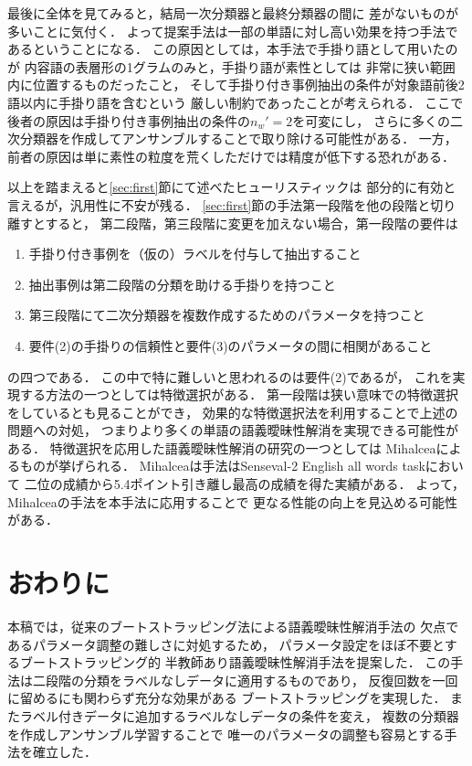 \documentclass[japanese]{jnlp_1.4}
\begin{document}
最後に全体を見てみると，結局一次分類器と最終分類器の間に
差がないものが多いことに気付く．
よって提案手法は一部の単語に対し高い効果を持つ手法であるということになる．
この原因としては，本手法で手掛り語として用いたのが
内容語の表層形の1グラムのみと，手掛り語が素性としては
非常に狭い範囲内に位置するものだったこと，
そして手掛り付き事例抽出の条件が対象語前後2語以内に手掛り語を含むという
厳しい制約であったことが考えられる．
ここで後者の原因は手掛り付き事例抽出の条件の$n_w'=2$を可変にし，
さらに多くの二次分類器を作成してアンサンブルすることで取り除ける可能性がある．
一方，前者の原因は単に素性の粒度を荒くしただけでは精度が低下する恐れがある．

以上を踏まえると\ref{sec:first}節にて述べたヒューリスティックは
部分的に有効と言えるが，汎用性に不安が残る．
\ref{sec:first}節の手法第一段階を他の段階と切り離すとすると，
第二段階，第三段階に変更を加えない場合，第一段階の要件は
\begin{enumerate}
\item 手掛り付き事例を（仮の）ラベルを付与して抽出すること
\item 抽出事例は第二段階の分類を助ける手掛りを持つこと
\item 第三段階にて二次分類器を複数作成するためのパラメータを持つこと
\item 要件(2)の手掛りの信頼性と要件(3)のパラメータの間に相関があること
\end{enumerate}
の四つである．
この中で特に難しいと思われるのは要件(2)であるが，
これを実現する方法の一つとしては特徴選択がある．
第一段階は狭い意味での特徴選択をしているとも見ることができ，
効果的な特徴選択法を利用することで上述の問題への対処，
つまりより多くの単語の語義曖昧性解消を実現できる可能性がある．
特徴選択を応用した語義曖昧性解消の研究の一つとしては
Mihalceaによるものが挙げられる\cite{Mihalcea02}．
Mihalceaは手法はSenseval-2 English all words taskにおいて
二位の成績から5.4ポイント引き離し最高の成績を得た実績がある．
よって，Mihalceaの手法を本手法に応用することで
更なる性能の向上を見込める可能性がある．



\section{おわりに}
\label{sec:conc}

本稿では，従来のブートストラッピング法による語義曖昧性解消手法の
欠点であるパラメータ調整の難しさに対処するため，
パラメータ設定をほぼ不要とするブートストラッピング的
半教師あり語義曖昧性解消手法を提案した．
この手法は二段階の分類をラベルなしデータに適用するものであり，
反復回数を一回に留めるにも関わらず充分な効果がある
ブートストラッピングを実現した．
またラベル付きデータに追加するラベルなしデータの条件を変え，
複数の分類器を作成しアンサンブル学習することで
唯一のパラメータの調整も容易とする手法を確立した．
\end{document}

